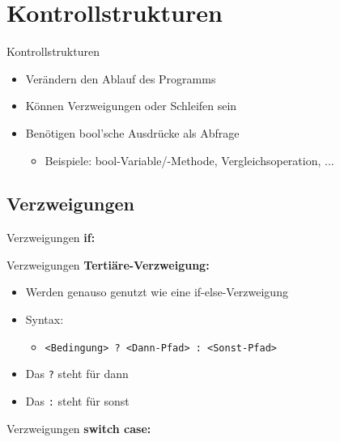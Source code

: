 \section{Kontrollstrukturen}
\begin{frame}{Kontrollstrukturen}
	\begin{itemize}
		\item Verändern den Ablauf des Programms
		\item Können Verzweigungen oder Schleifen sein
		\item Benötigen bool'sche Ausdrücke als Abfrage
		\begin{itemize}
			\item Beispiele: bool-Variable/-Methode, Vergleichsoperation, ...
		\end{itemize}
	\end{itemize}
\end{frame}

\subsection{Verzweigungen}
\begin{frame}{Verzweigungen}
	\textbf{if:}\\
	
\end{frame}

\begin{frame}{Verzweigungen}
	\textbf{Tertiäre-Verzweigung:}\\
	\begin{itemize}
		\item Werden genauso genutzt wie eine if-else-Verzweigung
		\item Syntax:
		\begin{itemize}
			\item \alert{\texttt{<Bedingung> ? <Dann-Pfad> : <Sonst-Pfad>}}
		\end{itemize}
		\item Das \alert{\texttt{?}} steht für \alert{dann}
		\item Das \alert{\texttt{:}} steht für \alert{sonst}
	\end{itemize}		
	
\end{frame}

\begin{frame}{Verzweigungen}
	\textbf{switch case:}\\
	
\end{frame}


